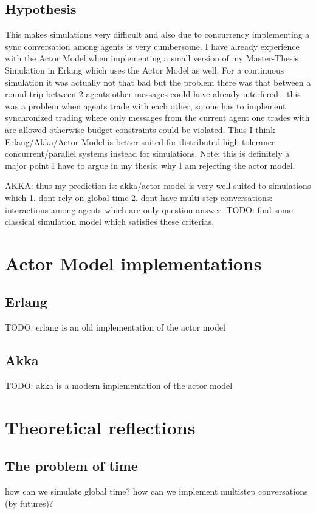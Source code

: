 \documentclass{article}
\begin{document}
\subsection{Hypothesis}
This makes simulations very difficult and also due to concurrency implementing a sync conversation among agents is very cumbersome. I have already experience with the Actor Model when implementing a small version of my Master-Thesis Simulation in Erlang which uses the Actor Model as well. For a continuous simulation it was actually not that bad but the problem there was that between a round-trip between 2 agents other messages could have already interfered - this was a problem when agents trade with each other, so one has to implement synchronized trading where only messages from the current agent one trades with are allowed otherwise budget constraints could be violated. Thus I think Erlang/Akka/Actor Model is better suited for distributed high-tolerance concurrent/parallel systems instead for simulations. Note: this is definitely a major point I have to argue in my thesis: why I am rejecting the actor model.

AKKA: thus my prediction is: akka/actor model is very well suited to simulations which 1. dont rely on global time 2. dont have multi-step conversations: interactions among agents which are only question-answer. TODO: find some classical simulation model which satisfies these criterias.

\section{Actor Model implementations}
\subsection{Erlang}
TODO: erlang is an old implementation of the actor model

\subsection{Akka}
TODO: akka is a modern implementation of the actor model

\section{Theoretical reflections}

\subsection{The problem of time}
 how can we simulate global time? how can we implement multistep conversations (by futures)?
\end{document}
